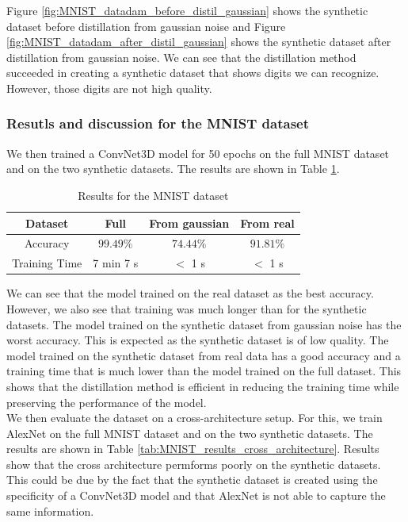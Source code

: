\documentclass[onecolumn]{IEEEtran}
\begin{document}
Figure \ref{fig:MNIST_datadam_before_distil_gaussian} shows the synthetic dataset before distillation from gaussian noise and Figure \ref{fig:MNIST_datadam_after_distil_gaussian} shows the synthetic dataset after distillation from gaussian noise. We can see that the distillation method succeeded in creating a synthetic dataset that shows digits we can recognize. However, those digits are not high quality.
\\
\subsubsection{Resutls and discussion for the MNIST dataset}
We then trained a ConvNet3D model for 50 epochs on the full MNIST dataset and on the two synthetic datasets. The results are shown in Table \ref{tab:MNIST_results}.

\begin{table}[H]
    \centering
    \begin{tabular}{|c|c|c|c|}
        \hline
        Dataset & Full & From gaussian & From real \\
        \hline
        Accuracy & $99.49\%$ & $74.44\%$ & $91.81\%$ \\
        \hline
        Training Time & 7 min 7 s & $<$ 1 s & $<$ 1 s \\
        \hline
    \end{tabular}
    \caption{Results for the MNIST dataset}
    \label{tab:MNIST_results}
\end{table}

We can see that the model trained on the real dataset as the best accuracy. However, we also see that training was much longer than for the synthetic datasets. The model trained on the synthetic dataset from gaussian noise has the worst accuracy. This is expected as the synthetic dataset is of low quality. The model trained on the synthetic dataset from real data has a good accuracy and a training time that is much lower than the model trained on the full dataset. This shows that the distillation method is efficient in reducing the training time while preserving the performance of the model.
\\
We then evaluate the dataset on a cross-architecture setup. For this, we train AlexNet on the full MNIST dataset and on the two synthetic datasets. The results are shown in Table \ref{tab:MNIST_results_cross_architecture}. Results show that the cross architecture permforms poorly on the synthetic datasets. This could be due by the fact that the synthetic dataset is created using the specificity of a ConvNet3D model and that AlexNet is not able to capture the same information.
\end{document}
